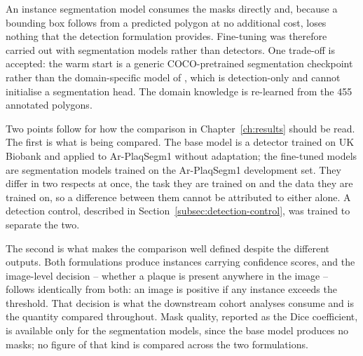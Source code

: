 An instance segmentation model consumes the masks directly and, because a bounding box follows
from a predicted polygon at no additional cost, loses nothing that the detection formulation
provides. Fine-tuning was therefore carried out with segmentation models rather than detectors.
One trade-off is accepted: the warm start is a generic COCO-pretrained segmentation checkpoint
rather than the domain-specific model of \textcite{omarov2024deep}, which is detection-only and
cannot initialise a segmentation head. The domain knowledge is re-learned from the 455 annotated
polygons.

Two points follow for how the comparison in Chapter~\ref{ch:results} should be read. The first
is what is being compared. The base model is a detector trained on UK Biobank and applied to
Ar-PlaqSegm1 without adaptation; the fine-tuned models are segmentation models trained on the
Ar-PlaqSegm1 development set. They differ in two respects at once, the task they are trained on
and the data they are trained on, so a difference between them cannot be attributed to either
alone. A detection control, described in Section~\ref{subsec:detection-control}, was trained to
separate the two.

The second is what makes the comparison well defined despite the different outputs. Both
formulations produce instances carrying confidence scores, and the image-level decision --
whether a plaque is present anywhere in the image -- follows identically from both: an image is
positive if any instance exceeds the threshold. That decision is what the downstream cohort
analyses consume and is the quantity compared throughout. Mask quality, reported as the Dice
coefficient, is available only for the segmentation models, since the base model produces no
masks; no figure of that kind is compared across the two formulations.

